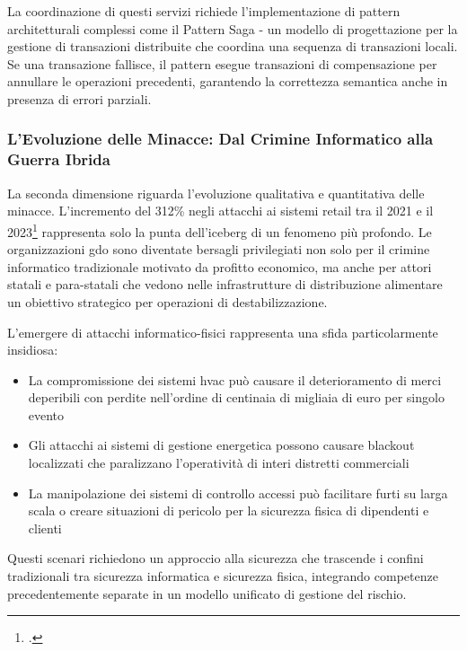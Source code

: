 La coordinazione di questi servizi richiede l'implementazione di pattern architetturali complessi come il Pattern Saga - un modello di progettazione per la gestione di transazioni distribuite che coordina una sequenza di transazioni locali. Se una transazione fallisce, il pattern esegue transazioni di compensazione per annullare le operazioni precedenti, garantendo la correttezza semantica anche in presenza di errori parziali.

\subsubsection{\texorpdfstring{\textbf{L'Evoluzione delle Minacce: Dal Crimine Informatico alla Guerra Ibrida}}{L'Evoluzione delle Minacce: Dal Crimine Informatico alla Guerra Ibrida}}
\label{subsubsec:evoluzione_minacce}

La seconda dimensione riguarda l'evoluzione qualitativa e quantitativa delle minacce. L'incremento del 312\% negli attacchi ai sistemi retail tra il 2021 e il 2023\footcite{enisa2024retail} rappresenta solo la punta dell'iceberg di un fenomeno più profondo. Le organizzazioni \gls{gdo} sono diventate bersagli privilegiati non solo per il crimine informatico tradizionale motivato da profitto economico, ma anche per attori statali e para-statali che vedono nelle infrastrutture di distribuzione alimentare un obiettivo strategico per operazioni di destabilizzazione.

L'emergere di attacchi informatico-fisici rappresenta una sfida particolarmente insidiosa:
\begin{itemize}
\item La compromissione dei sistemi \gls{hvac} può causare il deterioramento di merci deperibili con perdite nell'ordine di centinaia di migliaia di euro per singolo evento
\item Gli attacchi ai sistemi di gestione energetica possono causare blackout localizzati che paralizzano l'operatività di interi distretti commerciali
\item La manipolazione dei sistemi di controllo accessi può facilitare furti su larga scala o creare situazioni di pericolo per la sicurezza fisica di dipendenti e clienti
\end{itemize}

Questi scenari richiedono un approccio alla sicurezza che trascende i confini tradizionali tra sicurezza informatica e sicurezza fisica, integrando competenze precedentemente separate in un modello unificato di gestione del rischio.

